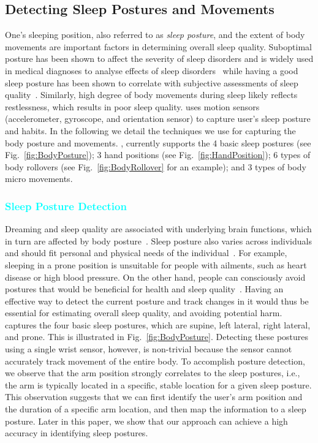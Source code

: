 \subsection{Detecting Sleep Postures and Movements}

One's sleeping position, also referred to as {\em sleep posture}, and the extent of body movements are important factors in determining
overall sleep quality. Suboptimal posture has been shown to affect the severity of sleep disorders and is widely used in medical diagnoses
to analyse effects of sleep disorders~\cite{oksenberg1998effect,eiseman2012impact} while having a good sleep posture has been shown to
correlate with subjective assessments of sleep quality~\cite{dekoninck83sleep}. Similarly, high degree of body movements during sleep
likely reflects restlessness, which results in poor sleep quality. {\systemname} uses motion sensors (accelerometer, gyroscope, and
orientation sensor) to capture user's sleep posture and habits. In the following we detail the techniques we use for capturing the body
posture and movements.  {\systemname}, currently supports the 4 basic sleep postures (see Fig.~\ref{fig:BodyPosture}); 3 hand positions
(see Fig.~\ref{fig:HandPosition}); 6 types of body rollovers (see Fig.~\ref{fig:BodyRollover} for an example); and 3 types of body micro
movements. %


\subsubsection{\textcolor{cyan}{Sleep Posture Detection}\label{sec:sleeppdet}}

Dreaming and sleep quality are associated with underlying brain functions, which in turn are affected by body posture~\cite{posture2004}.
Sleep posture also varies across individuals and should fit personal and physical needs of the individual~\cite{posture2016,posture2017}.
For example, sleeping in a prone position is unsuitable for people with ailments, such as heart disease or high blood pressure. On the
other hand, people can consciously avoid postures that would be beneficial for health and sleep quality~\cite{posture2015}. Having an
effective way to detect the current posture and track changes in it would thus be essential for estimating overall sleep quality, and
avoiding potential harm. \systemname captures the four basic sleep postures, which are supine, left lateral, right lateral, and prone. This
is illustrated in Fig.~\ref{fig:BodyPosture}. Detecting these postures using a single wrist sensor, however, is non-trivial because the
sensor cannot accurately track movement of the entire body. To accomplish posture detection, we observe that the arm position strongly correlates to the sleep postures, i.e.,
the arm is typically located in a specific, stable location for a given sleep posture. This observation suggests that we can first identify
the user's arm position and the duration of a specific arm location, and then map the information to a sleep posture. Later in this paper,
we show that our approach can achieve a high accuracy in identifying sleep postures.




